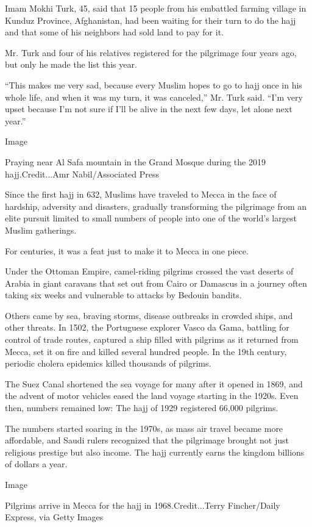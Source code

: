 Imam Mokhi Turk, 45, said that 15 people from his embattled farming
village in Kunduz Province, Afghanistan, had been waiting for their turn
to do the hajj and that some of his neighbors had sold land to pay for
it.

Mr. Turk and four of his relatives registered for the pilgrimage four
years ago, but only he made the list this year.

``This makes me very sad, because every Muslim hopes to go to hajj once
in his whole life, and when it was my turn, it was canceled,'' Mr. Turk
said. ``I'm very upset because I'm not sure if I'll be alive in the next
few days, let alone next year.''

Image

Praying near Al Safa mountain in the Grand Mosque during the 2019
hajj.Credit...Amr Nabil/Associated Press

Since the first hajj in 632, Muslims have traveled to Mecca in the face
of hardship, adversity and disasters, gradually transforming the
pilgrimage from an elite pursuit limited to small numbers of people into
one of the world's largest Muslim gatherings.

For centuries, it was a feat just to make it to Mecca in one piece.

Under the Ottoman Empire, camel-riding pilgrims crossed the vast deserts
of Arabia in giant caravans that set out from Cairo or Damascus in a
journey often taking six weeks and vulnerable to attacks by Bedouin
bandits.

Others came by sea, braving storms, disease outbreaks in crowded ships,
and other threats. In 1502, the Portuguese explorer Vasco da Gama,
battling for control of trade routes, captured a ship filled with
pilgrims as it returned from Mecca, set it on fire and killed several
hundred people. In the 19th century, periodic cholera epidemics killed
thousands of pilgrims.

The Suez Canal shortened the sea voyage for many after it opened in
1869, and the advent of motor vehicles eased the land voyage starting in
the 1920s. Even then, numbers remained low: The hajj of 1929 registered
66,000 pilgrims.

The numbers started soaring in the 1970s, as mass air travel became more
affordable, and Saudi rulers recognized that the pilgrimage brought not
just religious prestige but also income. The hajj currently earns the
kingdom billions of dollars a year.

Image

Pilgrims arrive in Mecca for the hajj in 1968.Credit...Terry
Fincher/Daily Express, via Getty Images


